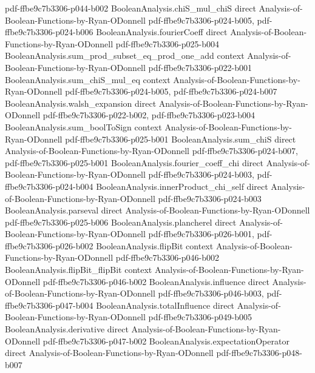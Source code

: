\begin{theorem}
  {pdf-ffbe9c7b3306-p044-b002}
\proofstep
  {BooleanAnalysis.chiS_mul_chiS}
  {direct}
  {Analysis-of-Boolean-Functions-by-Ryan-ODonnell}
  {pdf-ffbe9c7b3306-p024-b005,
    pdf-ffbe9c7b3306-p024-b006}
\proofstep
  {BooleanAnalysis.fourierCoeff}
  {direct}
  {Analysis-of-Boolean-Functions-by-Ryan-ODonnell}
  {pdf-ffbe9c7b3306-p025-b004}
\proofstep
  {BooleanAnalysis.sum_prod_subset_eq_prod_one_add}
  {context}
  {Analysis-of-Boolean-Functions-by-Ryan-ODonnell}
  {pdf-ffbe9c7b3306-p022-b001}
\proofstep
  {BooleanAnalysis.sum_chiS_mul_eq}
  {context}
  {Analysis-of-Boolean-Functions-by-Ryan-ODonnell}
  {pdf-ffbe9c7b3306-p024-b005,
    pdf-ffbe9c7b3306-p024-b007}
\proofstep
  {BooleanAnalysis.walsh_expansion}
  {direct}
  {Analysis-of-Boolean-Functions-by-Ryan-ODonnell}
  {pdf-ffbe9c7b3306-p022-b002,
    pdf-ffbe9c7b3306-p023-b004}
\proofstep
  {BooleanAnalysis.sum_boolToSign}
  {context}
  {Analysis-of-Boolean-Functions-by-Ryan-ODonnell}
  {pdf-ffbe9c7b3306-p025-b001}
\proofstep
  {BooleanAnalysis.sum_chiS}
  {direct}
  {Analysis-of-Boolean-Functions-by-Ryan-ODonnell}
  {pdf-ffbe9c7b3306-p024-b007,
    pdf-ffbe9c7b3306-p025-b001}
\proofstep
  {BooleanAnalysis.fourier_coeff_chi}
  {direct}
  {Analysis-of-Boolean-Functions-by-Ryan-ODonnell}
  {pdf-ffbe9c7b3306-p024-b003,
    pdf-ffbe9c7b3306-p024-b004}
\proofstep
  {BooleanAnalysis.innerProduct_chi_self}
  {direct}
  {Analysis-of-Boolean-Functions-by-Ryan-ODonnell}
  {pdf-ffbe9c7b3306-p024-b003}
\proofstep
  {BooleanAnalysis.parseval}
  {direct}
  {Analysis-of-Boolean-Functions-by-Ryan-ODonnell}
  {pdf-ffbe9c7b3306-p025-b006}
\proofstep
  {BooleanAnalysis.plancherel}
  {direct}
  {Analysis-of-Boolean-Functions-by-Ryan-ODonnell}
  {pdf-ffbe9c7b3306-p026-b001,
    pdf-ffbe9c7b3306-p026-b002}
\proofstep
  {BooleanAnalysis.flipBit}
  {context}
  {Analysis-of-Boolean-Functions-by-Ryan-ODonnell}
  {pdf-ffbe9c7b3306-p046-b002}
\proofstep
  {BooleanAnalysis.flipBit_flipBit}
  {context}
  {Analysis-of-Boolean-Functions-by-Ryan-ODonnell}
  {pdf-ffbe9c7b3306-p046-b002}
\proofstep
  {BooleanAnalysis.influence}
  {direct}
  {Analysis-of-Boolean-Functions-by-Ryan-ODonnell}
  {pdf-ffbe9c7b3306-p046-b003,
    pdf-ffbe9c7b3306-p047-b004}
\proofstep
  {BooleanAnalysis.totalInfluence}
  {direct}
  {Analysis-of-Boolean-Functions-by-Ryan-ODonnell}
  {pdf-ffbe9c7b3306-p049-b005}
\proofstep
  {BooleanAnalysis.derivative}
  {direct}
  {Analysis-of-Boolean-Functions-by-Ryan-ODonnell}
  {pdf-ffbe9c7b3306-p047-b002}
\proofstep
  {BooleanAnalysis.expectationOperator}
  {direct}
  {Analysis-of-Boolean-Functions-by-Ryan-ODonnell}
  {pdf-ffbe9c7b3306-p048-b007}

\end{theorem}
